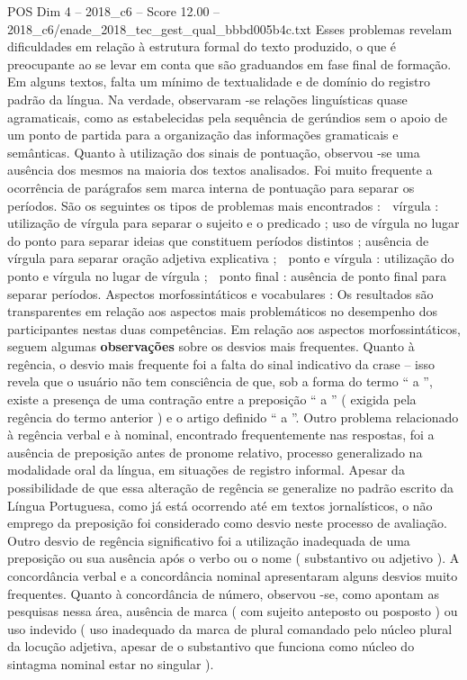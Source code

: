 \begin{textsample}{POS Dim 4 – 2018\_c6 – Score 12.00 – 2018\_c6/enade\_2018\_tec\_gest\_qual\_bbbd005b4c.txt}
Esses problemas revelam dificuldades em relação à estrutura formal do texto produzido, o que é preocupante ao se levar em conta que são graduandos em fase final de formação.
Em alguns textos, falta um mínimo de textualidade e de domínio do registro padrão da língua.
Na verdade, observaram -se relações linguísticas quase agramaticais, como as estabelecidas pela sequência de gerúndios sem o apoio de um ponto de partida para a organização das informações gramaticais e semânticas.
Quanto à utilização dos sinais de pontuação, observou -se uma ausência dos mesmos na maioria dos textos analisados.
Foi muito frequente a ocorrência de parágrafos sem marca interna de pontuação para separar os períodos.
São os seguintes os tipos de problemas mais encontrados :  vírgula : utilização de vírgula para separar o sujeito e o predicado ; uso de vírgula no lugar do ponto para separar ideias que constituem períodos distintos ; ausência de vírgula para separar oração adjetiva explicativa ;  ponto e vírgula : utilização do ponto e vírgula no lugar de vírgula ;  ponto final : ausência de ponto final para separar períodos.
Aspectos morfossintáticos e vocabulares : Os resultados são transparentes em relação aos aspectos mais problemáticos no desempenho dos participantes nestas duas competências.
Em relação aos aspectos morfossintáticos, seguem algumas \textbf{observações} sobre os desvios mais frequentes.
Quanto à regência, o desvio mais frequente foi a falta do sinal indicativo da crase – isso revela que o usuário não tem consciência de que, sob a forma do termo “ a ”, existe a presença de uma contração entre a preposição “ a ” ( exigida pela regência do termo anterior ) e o artigo definido “ a ”.
Outro problema relacionado à regência verbal e à nominal, encontrado frequentemente nas respostas, foi a ausência de preposição antes de pronome relativo, processo generalizado na modalidade oral da língua, em situações de registro informal.
Apesar da possibilidade de que essa alteração de regência se generalize no padrão escrito da Língua Portuguesa, como já está ocorrendo até em textos jornalísticos, o não emprego da preposição foi considerado como desvio neste processo de avaliação.
Outro desvio de regência significativo foi a utilização inadequada de uma preposição ou sua ausência após o verbo ou o nome ( substantivo ou adjetivo ).
A concordância verbal e a concordância nominal apresentaram alguns desvios muito frequentes.
Quanto à concordância de número, observou -se, como apontam as pesquisas nessa área, ausência de marca ( com sujeito anteposto ou posposto ) ou uso indevido ( uso inadequado da marca de plural comandado pelo núcleo plural da locução adjetiva, apesar de o substantivo que funciona como núcleo do sintagma nominal estar no singular ).

\end{textsample}
